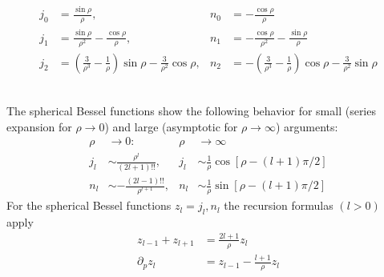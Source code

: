 \begin{equation}
\begin{aligned} 
j_{0} &=\frac{\sin \rho}{\rho}, & n_{0} &=-\frac{\cos \rho}{\rho} \\ 
j_{1} &=\frac{\sin \rho}{\rho^{2}}-\frac{\cos \rho}{\rho}, & n_{1} &=-\frac{\cos \rho}{\rho^{2}}-\frac{\sin \rho}{\rho} \\ 
j_{2} &=\left(\frac{3}{\rho^{3}}-\frac{1}{\rho}\right) \sin \rho-\frac{3}{\rho^{2}} \cos \rho, & n_{2} &=-\left(\frac{3}{\rho^{3}}-\frac{1}{\rho}\right) \cos \rho-\frac{3}{\rho^{2}} \sin \rho
\end{aligned}
\end{equation}
\begin{figure}[ht]
    \centering
\end{figure}
\\
The spherical Bessel functions show the following behavior for small (series expansion for $\rho \rightarrow 0$) and large (asymptotic for $\rho \rightarrow \infty$) arguments:
\begin{equation}
\begin{aligned} \rho & \rightarrow 0: & \rho & \rightarrow \infty \\ j_{l} & \sim \frac{\rho^{l}}{(2 l+1) ! !}, & j_{l} & \sim \frac{1}{\rho} \cos [\rho-(l+1) \pi / 2] \\ n_{l} & \sim-\frac{(2 l-1) ! !}{\rho^{l+1}},   &n_{l} &\sim \frac{1}{\rho} \sin [\rho-(l+1) \pi / 2] \end{aligned}
\end{equation}
For the spherical Bessel functions $z_l = j_l, n_l$ the recursion formulas $(l> 0)$ apply
\begin{equation}
\begin{aligned}
    z_{l-1}+z_{l+1}&=\frac{2 l+1}{\rho} z_{l}\\
    \partial_pz_l&=z_{l-1}-\frac{l+1}{\rho}z_l
\end{aligned}
\end{equation}
